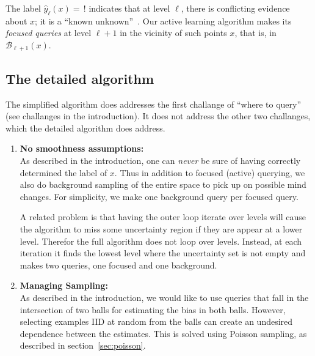 \documentclass[twoside]{article}
\def\B{{\mathcal B}}
\def\yh{{\widehat{y}}}
\def\PL{{\mbox{\rm PL}}}
\begin{document}
The label $\yh_\ell(x) = \, !$ indicates that at level $\ell$, there is conflicting evidence about $x$; it is a ``known unknown''~\cite{R11}. Our active learning algorithm makes its \emph{focused queries} at level $\ell+1$ in the vicinity of such points $x$, that is, in $\B_{\ell+1}(x)$.


\fi




\subsection{The detailed algorithm}
\label{sec:detailedalgorithm}

The simplified algorithm does addresses the first challange of ``where
to query'' (see challanges in the introduction). It does not address
the other two challanges, which the detailed algorithm does address.

\begin{enumerate}
\item {\bf No smoothness assumptions:}\\
  As described in the introduction, one can \emph{never} be sure of having
  correctly determined the label of $x$. Thus in addition to focused
  (active) querying, we also do background sampling of the entire
  space to pick up on possible mind changes. For simplicity, we make
  one background query per focused query.

  A related problem is that having the outer loop iterate over levels
  will cause the algorithm to miss some uncertainty region if they are
  appear at a lower level. Therefor the full algorithm does not loop
  over levels. Instead, at each iteration it finds the lowest level
  where the uncertainty set is not empty and makes two queries, one
  focused and one background.

\item {\bf Managing Sampling:}\\
  As described in the introduction, we would like to use queries that
  fall in the intersection of two balls for estimating the bias in
  both balls. However, selecting examples IID at random from the balls
  can create an undesired dependence between the estimates. This is solved using Poisson sampling, as described in section~\ref{sec:poisson}.
\end{enumerate}
\end{document}
